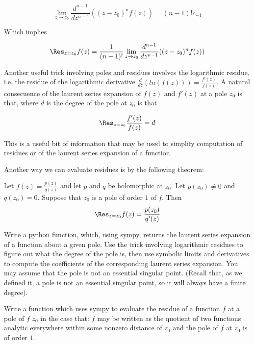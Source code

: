 \begin{equation*}
\lim_{z\to z_0}\frac{d^{n-1}}{dz^{n-1}}((z-z_0)^n f(z)) = (n-1)! c_{-1}
\end{equation*}

Which implies

\begin{equation*}
\Res_{z=z_0}f(z)=\frac{1}{(n-1)!}\lim_{z\to z_0}\frac{d^{n-1}}{dz^{n-1}}((z-z_0)^n f(z))
\end{equation*}
	
Another useful trick involving poles and residues involves the logarithmic residue, i.e. the residue of the logarithmic derivative $\frac{d}{dz}(ln(f(z))) = \frac{f'(z)}{f(z)}$. A natural consecuence of the laurent series expansion of $f(z)$ and $f'(z)$ at a pole $z_0$ is that, where $d$ is the degree of the pole at $z_0$ is that

\begin{equation*}
\Res_{z=z_0} \frac{f'(z)}{f(z)} = d
\end{equation*}

This is a useful bit of information that may be used to simplify computation of residues or of the laurent series expansion of a function. 

Another way we can evaluate residues is by the following theorem:

Let $f(z)=\frac{p(z)}{q(z)}$ and let $p$ and $q$ be holomorphic at $z_0$. Let $p(z_0) \neq 0$ and $q(z_0)=0$. Suppose that $z_0$ is a pole of order $1$ of $f$. Then 
\begin{equation*}
\Res_{z=z_0} f(z) = \frac{p(z_0)}{q'(z)}
\end{equation*}

\begin{problem}
Write a python function, which, using sympy, returns the laurent series expansion of a function about a given pole. Use the trick involving logarithmic residues to figure out what the degree of the pole is, then use symbolic limits and derivatives to compute the coefficients of the corresponding laurent series expansion. You may assume that the pole is not an essential singular point. (Recall that, as we defined it, a pole is not an essential singular point, so it will always have a finite degree).
\end{problem}

\begin{problem}
Write a function which uses sympy to evaluate the residue of a function $f$ at a pole of $f$ $z_0$ in the case that: $f$ may be written as the quotient of two functions analytic everywhere within some nonzero distance of $z_0$ and the pole of $f$ at $z_0$ is of order $1$.
\end{problem}

